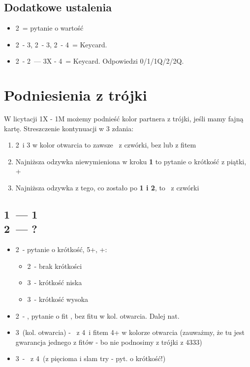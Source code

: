 \documentclass[12pt, a4paper]{article}
\begin{document}
\subsection{Dodatkowe ustalenia}
\begin{itemize}
    \item 2\nt\ = pytanie o wartość
    \item 2\diams\ - 3\hearts, 2\hearts\ - 3\spades, 2\spades\ - 4\clubs\ = Keycard.
    \item 2\diams\hearts\spades\ - 2\nt\ --- 3X - 4\clubs\ = Keycard.
    Odpowiedzi 0/1/1Q/2/2Q.
\end{itemize}




\pagebreak
\section{Podniesienia z trójki}
W licytacji 1X - 1M możemy podnieść kolor partnera z trójki, jeśli mamy fajną kartę.
Streszczenie kontynuacji w 3 zdania:
\begin{enumerate}[label=\textbf{\arabic*.}]
    \item 2\nt\ i 3 w kolor otwarcia to zawsze \inv\ z czwórki, bez lub z fitem \minor\ 
    \item Najniższa odzywka niewymieniona w kroku \textbf{1} to pytanie o krótkość z piątki, \inv+
    \item Najniższa odzywka z tego, co zostało po \textbf{1 i 2}, to \gf\ z czwórki
\end{enumerate}

\subsection{1\clubs\ --- 1\hearts \\ 2\hearts\ --- ?}
\begin{itemize}
    \item 2\spades\ - pytanie o krótkość, 5+\spades, \inv+:
    \begin{itemize}
        \item 2\nt\ - brak krótkości
        \item 3\clubs\ - krótkość niska
        \item 3\diams\ - krótkość wysoka
    \end{itemize}
    \item 2\nt\ - \inv, pytanie o fit \spades, bez fitu w kol. otwarcia. Dalej nat.
    \item 3\clubs\ (kol. otwarcia) - \inv\ z 4\spades\ i fitem 4+ w kolorze otwarcia
    (zauważmy, że tu jest gwarancja jednego z fitów - bo nie podnosimy z trójki z 4333)
    \item 3\diams\ - \gf\ z 4\spades\ (z pięcioma i slam try - pyt. o krótkość!)
\end{itemize}
\end{document}
